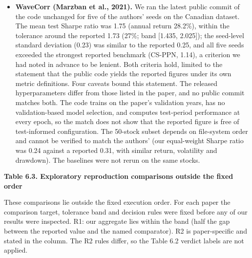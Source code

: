 \documentclass[12pt,a4paper]{report}
\begin{document}
\begin{itemize}
  an equal-weight portfolio of the same 29 stocks (1.47 at 0.1\% cost;
  1.46 for buy-and-hold). As in the five-ticker setting, every policy
  traded only on the first day; under the environment's initial capital
  and per-trade share limit, each then held two to four stocks. This run
  changes the universe and, through these limits, the concentration of
  holdings at the same time, so it does not isolate the effect of the
  five-ticker selection. If the 29-ticker list reflects a later index
  composition, survivorship would favour both the policies and the
  benchmark.
\item
  \textbf{WaveCorr (Marzban et al., 2021).} We ran the latest public
  commit of the code unchanged for five of the authors' seeds on the
  Canadian dataset. The mean test Sharpe ratio was 1.75 (annual return
  28.2\%), within the tolerance around the reported 1.73 (27\%; band
  {[}1.435, 2.025{]}); the seed-level standard deviation (0.23) was
  similar to the reported 0.25, and all five seeds exceeded the
  strongest reported benchmark (CS-PPN, 1.14), a criterion we had noted
  in advance to be lenient. Both criteria hold, limited to the statement
  that the public code yields the reported figures under its own metric
  definitions. Four caveats bound this statement. The released
  hyperparameters differ from those listed in the paper, and no public
  commit matches both. The code trains on the paper's validation years,
  has no validation-based model selection, and computes test-period
  performance at every epoch, so the match does not show that the
  reported figure is free of test-informed configuration. The 50-stock
  subset depends on file-system order and cannot be verified to match
  the authors' (our equal-weight Sharpe ratio was 0.24 against a
  reported 0.31, with similar return, volatility and drawdown). The
  baselines were not rerun on the same stocks.
\end{itemize}

\textbf{Table 6.3. Exploratory reproduction comparisons outside the
fixed order}

These comparisons lie outside the fixed execution order. For each paper
the comparison target, tolerance band and decision rules were fixed
before any of our results were inspected. R1: our aggregate lies within
the band (half the gap between the reported value and the named
comparator). R2 is paper-specific and stated in the column. The R2 rules
differ, so the Table 6.2 verdict labels are not applied.
\end{document}
